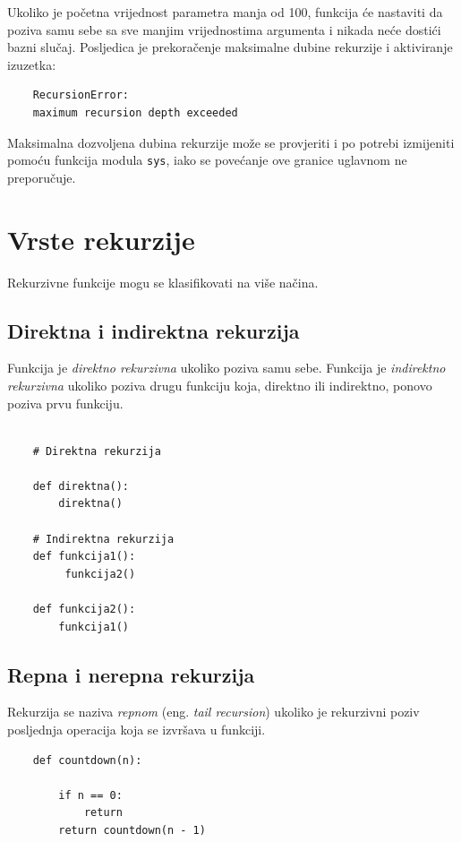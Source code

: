 Ukoliko je početna vrijednost parametra manja od 100, funkcija će nastaviti da poziva samu sebe sa sve manjim vrijednostima argumenta i nikada neće dostići bazni slučaj. Posljedica je prekoračenje maksimalne dubine rekurzije i aktiviranje izuzetka:

\begin{verbatim}
	RecursionError:
	maximum recursion depth exceeded
\end{verbatim}

Maksimalna dozvoljena dubina rekurzije može se provjeriti i po potrebi izmijeniti pomoću funkcija modula \texttt{sys}, iako se povećanje ove granice uglavnom ne preporučuje.

\section{Vrste rekurzije}

Rekurzivne funkcije mogu se klasifikovati na više načina.

\subsection*{Direktna i indirektna rekurzija}

Funkcija je \textit{direktno rekurzivna} ukoliko poziva samu sebe. Funkcija je \textit{indirektno rekurzivna} ukoliko poziva drugu funkciju koja, direktno ili indirektno, ponovo poziva prvu funkciju.

\begin{verbatim}
	
	# Direktna rekurzija
	
	def direktna():
	    direktna()
	
	# Indirektna rekurzija
	def funkcija1():
	     funkcija2()
	
	def funkcija2():
	    funkcija1()
\end{verbatim}

\subsection*{Repna i nerepna rekurzija}

Rekurzija se naziva \textit{repnom} (eng. \textit{tail recursion}) ukoliko je rekurzivni poziv posljednja operacija koja se izvršava u funkciji.

\begin{verbatim}
	def countdown(n):
	
	    if n == 0:
	        return
	    return countdown(n - 1)
	
\end{verbatim}

